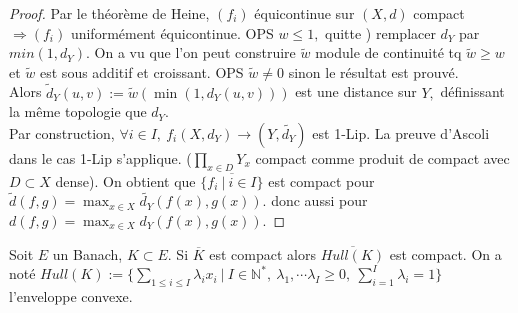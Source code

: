\begin{proof}
    Par le théorème de Heine, $(f_i)$ équicontinue sur $(X,d)$ compact $\Rightarrow (f_i)$ uniformément équicontinue. OPS $w\le 1,$ quitte ) remplacer $d_Y$ par $min(1,d_Y).$ On a vu que l'on peut construire $\tilde{w}$ module de continuité tq $\tilde{w}\ge w$ et $\tilde{w}$ est sous additif et croissant. OPS $\tilde{w}\neq 0$ sinon le résultat est prouvé. \\
    Alors $\tilde{d}_Y(u,v):=\tilde{w}(\min(1,d_Y(u,v)))$ est une distance sur $Y,$ définissant la même topologie que $d_Y$.\\
    Par construction, $\forall i\in I,\ f_i(X,d_Y)\to (Y,\tilde{d_{Y}}) $ est 1-Lip. La preuve d'Ascoli dans le cas 1-Lip s'applique. ($\prod\limits_{x\in D}^{}Y_x$ compact comme produit de compact avec $D\subset X$ dense). On obtient  que $\overline{\{f_i\ |\ i\in I\} }$ est compact pour $\tilde{d}(f,g)=\max_{x\in X}\tilde{d_Y}(f(x),g(x)).$ donc aussi pour  $d(f,g)=\max_{x\in X}d_Y(f(x),g(x)).$
\end{proof}
\begin{propriete}
	\label{hull}
    Soit $E$ un Banach, $K\subset E.$ Si $\overline{K}$ est compact alors $\overline{Hull(K)}$ est compact. On a noté $Hull(K):=\{\sum\limits_{1\le i\le I}^{} \lambda_ix_i\ |\ I\in \mathbb{N} ^*,\ \lambda_1,\cdots\lambda_I\ge 0,\ \sum\limits_{i=1}^{I} \lambda_i=1\} $ l'enveloppe convexe.
\end{propriete}
